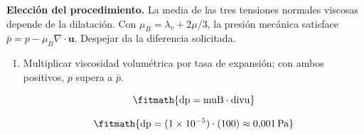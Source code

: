 \noindent\textbf{Elección del procedimiento.} La media de las tres tensiones normales viscosas depende de la dilatación. Con $\mu_B=\lambda_v+2\mu/3$, la presión mecánica satisface $\bar p=p-\mu_B\nabla\cdot\boldsymbol u$. Despejar da la diferencia solicitada.

\begin{enumerate}

\item Multiplicar viscosidad volumétrica por tasa de expansión; con ambos positivos, $p$ supera a $\bar p$.

\[\fitmath{\mathrm{dp}=\mathrm{muB}\cdot \mathrm{divu}}\]

\[\fitmath{\mathrm{dp}=(1\times10^{-5})\cdot (100)\approx 0{,}001\,\mathrm{Pa}}\]

\end{enumerate}
